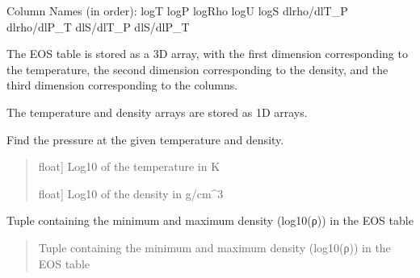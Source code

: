 \documentclass[letterpaper,10pt,english]{sphinxmanual}
\begin{document}
\begin{fulllineitems}
\begin{fulllineitems}
\sphinxAtStartPar
Column Names (in order):
\sphinxhyphen{} logT
\sphinxhyphen{} logP
\sphinxhyphen{} logRho
\sphinxhyphen{} logU
\sphinxhyphen{} logS
\sphinxhyphen{} dlrho/dlT\_P
\sphinxhyphen{} dlrho/dlP\_T
\sphinxhyphen{} dlS/dlT\_P
\sphinxhyphen{} dlS/dlP\_T

\sphinxAtStartPar
The EOS table is stored as a 3D array, with the first dimension corresponding to the temperature, the second
dimension corresponding to the density, and the third dimension corresponding to the columns.

\sphinxAtStartPar
The temperature and density arrays are stored as 1D arrays.

\end{fulllineitems}


\begin{fulllineitems}
\label{\detokenize{CoolDwarf.EOS.ChabrierDebras2021:CoolDwarf.EOS.ChabrierDebras2021.EOS.CH21EOS.pressure}}
\pysigstartsignatures
{}
\pysigstopsignatures
\sphinxAtStartPar
Find the pressure at the given temperature and density.
\begin{quote}\begin{description}
\begin{description}
\sphinxlineitem{\sphinxstylestrong{logT}}{[}float{]}
\sphinxAtStartPar
Log10 of the temperature in K

\sphinxlineitem{\sphinxstylestrong{logRho}}{[}float{]}
\sphinxAtStartPar
Log10 of the density in g/cm\textasciicircum{}3

\end{description}

\end{description}\end{quote}

\end{fulllineitems}


\begin{fulllineitems}
\label{\detokenize{CoolDwarf.EOS.ChabrierDebras2021:CoolDwarf.EOS.ChabrierDebras2021.EOS.CH21EOS.rhoRange}}
\pysigstartsignatures
{}
\pysigstopsignatures
\sphinxAtStartPar
Tuple containing the minimum and maximum density (log10(ρ)) in the EOS table
\begin{quote}\begin{description}
\begin{description}
\sphinxAtStartPar
Tuple containing the minimum and maximum density (log10(ρ)) in the EOS table


\end{description}
\end{description}
\end{quote}
\end{fulllineitems}
\end{fulllineitems}
\end{document}

